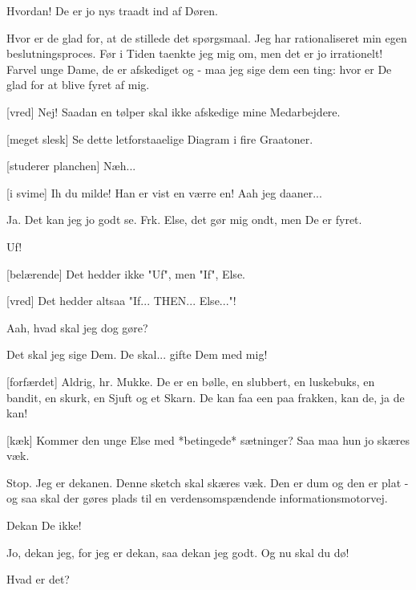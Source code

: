 \documentclass[a4paper,12pt]{article}
\begin{document}
\begin{sketch}
 Hvordan! De er jo nys traadt ind af Døren.

 Hvor er de glad for, at de stillede det spørgsmaal. Jeg har
rationaliseret min egen beslutningsproces. Før i Tiden taenkte jeg mig
om, men det er jo irrationelt!  Farvel unge Dame, de er
afskediget og - maa jeg sige dem een ting: hvor er De glad for at
blive fyret af mig.

[vred] Nej! Saadan en tølper skal ikke afskedige mine
Medarbejdere.

[meget slesk] Se dette letforstaaelige Diagram i fire
Graatoner. 

[studerer planchen] Næh... 

[i svime] Ih du milde! Han er vist en værre en! Aah jeg
daaner... 

 Ja. Det kan jeg jo godt se.  Frk. Else, det gør mig ondt, men De
er fyret.

 Uf! 

[belærende] Det hedder ikke "Uf", men "If", Else.

[vred] Det hedder altsaa "If... THEN... Else..."! 


 Aah, hvad skal jeg dog gøre?

 Det skal jeg sige Dem. De skal...  gifte
Dem med mig!

[forfærdet] Aldrig, hr. Mukke. De er en bølle, en slubbert, en
luskebuks, en bandit, en skurk, en Sjuft og et Skarn. De kan faa een
paa frakken, kan de, ja de kan!

[kæk] Kommer den unge Else med *betingede* sætninger? Saa maa
hun jo skæres væk.


 Stop. Jeg er dekanen. Denne sketch skal skæres væk. Den er dum og den er
plat - og saa skal der gøres plads til en verdensomspændende
informationsmotorvej.

 Dekan De ikke!

 Jo, dekan jeg, for jeg er dekan, saa dekan jeg godt.  Og
nu skal du dø! 

 Hvad er det?


\end{sketch}
\end{document}
